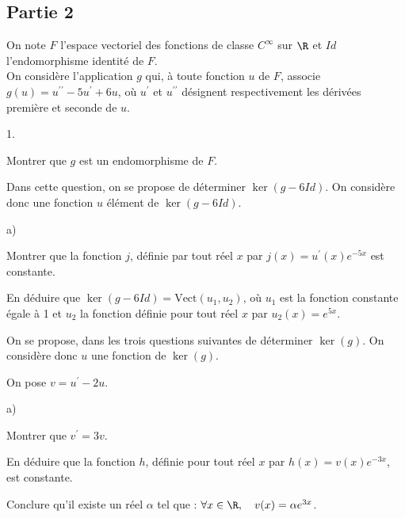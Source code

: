 \documentclass[11pt]{article}%
\begin{document}
\subsection*{Partie 2}

On note $F$ l'espace vectoriel des fonctions de classe $C^{\infty }$
sur $\R$ et $Id$ l'endomorphisme identité de $F$.\\
On considère l'application $g$ qui, à toute fonction $u$ de $F$,
associe $g(u) = u^{\prime \prime }-5u^{\prime } + 6u$, où $u^{\prime }$
et $u^{\prime \prime }$ désignent respectivement les dérivées première
et seconde de $u$.

\begin{noliste}{1.}
 \setlength{\itemsep}{4mm}
\item Montrer que $g$ est un endomorphisme de $F$.

\item Dans cette question, on se propose de déterminer $\ker \left(
g-6Id\right) $. On considère donc une fonction $u$ élément de $\ker
\left( g-6Id\right) $.

\begin{noliste}{a)}
 \setlength{\itemsep}{2mm}
\item Montrer que la fonction $j$, définie par tout réel $x$ par $j(x)
= u^{\prime }\left( x\right) e^{-5x}$ est constante.

\item En déduire que $\ker \left( g-6Id\right) = \mathrm{Vect}\left(
u_{1},u_{2}\right) $, où $u_{1}$ est la fonction constante égale 
à 1 et $u_{2}$ la fonction définie pour tout réel $x$ par $u_{2}(x) =
e^{5x}$.\\
\end{noliste}

On se propose, dans les trois questions suivantes de déterminer $\ker
\left( g\right) $. On considère donc $u$ une fonction de $\ker \left(
g\right) $.

\item On pose $v = u^{\prime }-2u$.

\begin{noliste}{a)}
 \setlength{\itemsep}{2mm}
\item Montrer que $v^{\prime } = 3v$.

\item En déduire que la fonction $h$, définie pour tout réel $x$
par $h(x) = v(x)e^{-3x}$, est constante.

\item Conclure qu'il existe un réel $\alpha $ tel que : $\forall x\in 
\R,\quad v(x) = \alpha e^{3x}$.
\end{noliste}


\end{noliste}
\end{document}
